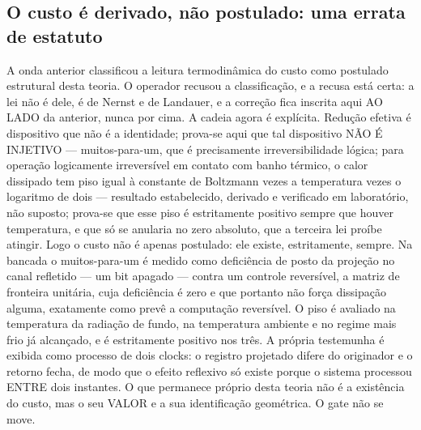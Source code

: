 \documentclass[11pt]{article}
\theoremstyle{definition}\newtheorem{deriv}{Derivação}
\begin{document}
\subsection*{O custo \'e derivado, n\~ao postulado: uma errata de estatuto}A onda anterior classificou a leitura termodin\^amica do custo como postulado estrutural desta teoria. O operador recusou a classifica\c{c}\~ao, e a recusa est\'a certa: a lei n\~ao \'e dele, \'e de Nernst e de Landauer, e a corre\c{c}\~ao fica inscrita aqui AO LADO da anterior, nunca por cima. A cadeia agora \'e expl\'icita. Redu\c{c}\~ao efetiva \'e dispositivo que n\~ao \'e a identidade; prova-se aqui que tal dispositivo N\~AO \'E INJETIVO --- muitos-para-um, que \'e precisamente irreversibilidade l\'ogica; para opera\c{c}\~ao logicamente irrevers\'ivel em contato com banho t\'ermico, o calor dissipado tem piso igual \`a constante de Boltzmann vezes a temperatura vezes o logaritmo de dois --- resultado estabelecido, derivado e verificado em laborat\'orio, n\~ao suposto; prova-se que esse piso \'e estritamente positivo sempre que houver temperatura, e que s\'o se anularia no zero absoluto, que a terceira lei pro\'ibe atingir. Logo o custo n\~ao \'e apenas postulado: ele existe, estritamente, sempre. Na bancada o muitos-para-um \'e medido como defici\^encia de posto da proje\c{c}\~ao no canal refletido --- um bit apagado --- contra um controle revers\'ivel, a matriz de fronteira unit\'aria, cuja defici\^encia \'e zero e que portanto n\~ao for\c{c}a dissipa\c{c}\~ao alguma, exatamente como prev\^e a computa\c{c}\~ao revers\'ivel. O piso \'e avaliado na temperatura da radia\c{c}\~ao de fundo, na temperatura ambiente e no regime mais frio j\'a alcan\c{c}ado, e \'e estritamente positivo nos tr\^es. A pr\'opria testemunha \'e exibida como processo de dois clocks: o registro projetado difere do originador e o retorno fecha, de modo que o efeito reflexivo s\'o existe porque o sistema processou ENTRE dois instantes. O que permanece pr\'oprio desta teoria n\~ao \'e a exist\^encia do custo, mas o seu VALOR e a sua identifica\c{c}\~ao geom\'etrica. O gate n\~ao se move.
\end{document}
